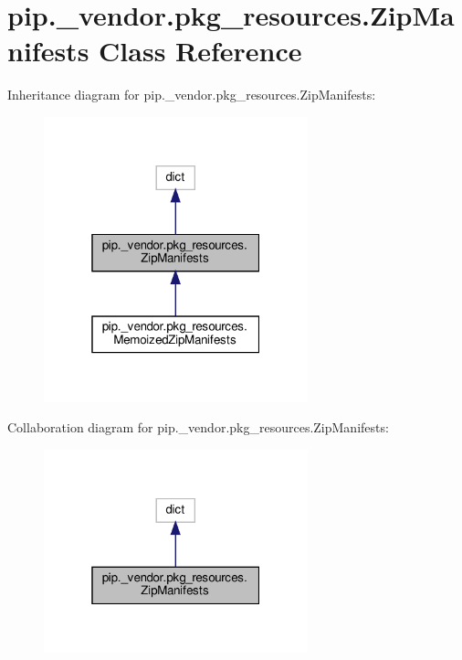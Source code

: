 \hypertarget{classpip_1_1__vendor_1_1pkg__resources_1_1ZipManifests}{}\section{pip.\+\_\+vendor.\+pkg\+\_\+resources.\+Zip\+Manifests Class Reference}
\label{classpip_1_1__vendor_1_1pkg__resources_1_1ZipManifests}


Inheritance diagram for pip.\+\_\+vendor.\+pkg\+\_\+resources.\+Zip\+Manifests\+:
\nopagebreak
\begin{figure}[H]
\begin{center}
\leavevmode
\includegraphics[width=217pt]{classpip_1_1__vendor_1_1pkg__resources_1_1ZipManifests__inherit__graph}
\end{center}
\end{figure}


Collaboration diagram for pip.\+\_\+vendor.\+pkg\+\_\+resources.\+Zip\+Manifests\+:
\nopagebreak
\begin{figure}[H]
\begin{center}
\leavevmode
\includegraphics[width=217pt]{classpip_1_1__vendor_1_1pkg__resources_1_1ZipManifests__coll__graph}
\end{center}
\end{figure}
